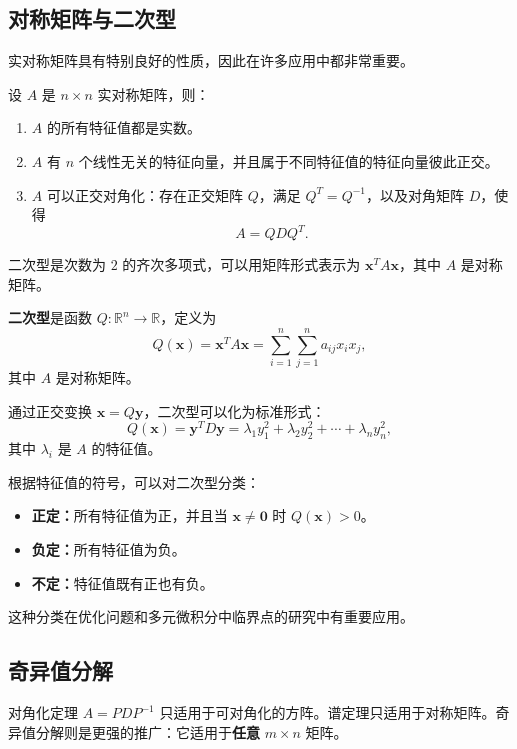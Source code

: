 \subsection{对称矩阵与二次型}

实对称矩阵具有特别良好的性质，因此在许多应用中都非常重要。

\begin{theorem}[谱定理]
设 $A$ 是 $n\times n$ 实对称矩阵，则：
\begin{enumerate}
    \item $A$ 的所有特征值都是实数。
    \item $A$ 有 $n$ 个线性无关的特征向量，并且属于不同特征值的特征向量彼此正交。
    \item $A$ 可以正交对角化：存在正交矩阵 $Q$，满足 $Q^T=Q^{-1}$，以及对角矩阵 $D$，使得
    \[
    A=QDQ^T.
    \]
\end{enumerate}
\end{theorem}

二次型是次数为 $2$ 的齐次多项式，可以用矩阵形式表示为 $\mathbf{x}^TA\mathbf{x}$，其中 $A$ 是对称矩阵。

\begin{definition}[二次型]
\textbf{二次型}是函数 $Q:\mathbb{R}^n\to\mathbb{R}$，定义为
\[
Q(\mathbf{x})=\mathbf{x}^TA\mathbf{x}=\sum_{i=1}^{n}\sum_{j=1}^{n}a_{ij}x_ix_j,
\]
其中 $A$ 是对称矩阵。
\end{definition}

通过正交变换 $\mathbf{x}=Q\mathbf{y}$，二次型可以化为标准形式：
\[
Q(\mathbf{x})=\mathbf{y}^TD\mathbf{y}=\lambda_1y_1^2+\lambda_2y_2^2+\cdots+\lambda_ny_n^2,
\]
其中 $\lambda_i$ 是 $A$ 的特征值。

根据特征值的符号，可以对二次型分类：
\begin{itemize}
    \item \textbf{正定：}所有特征值为正，并且当 $\mathbf{x}\neq\mathbf{0}$ 时 $Q(\mathbf{x})>0$。
    \item \textbf{负定：}所有特征值为负。
    \item \textbf{不定：}特征值既有正也有负。
\end{itemize}

这种分类在优化问题和多元微积分中临界点的研究中有重要应用。

\subsection{奇异值分解}
对角化定理 $A=PDP^{-1}$ 只适用于可对角化的方阵。谱定理只适用于对称矩阵。奇异值分解则是更强的推广：它适用于\textbf{任意} $m\times n$ 矩阵。

